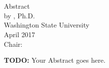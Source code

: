 \label{chap:chapter-1}

\begin{center}
	\begin{singlespace}
		\label{ssec:abstract}

		\MakeUppercase{\mytitleA}\\
    	\bigskip
    	\MakeUppercase{\mytitleB}\\
		\bigskip
		Abstract\\
		\bigskip \bigskip \bigskip
		by \myname, Ph.D.\\
		Washington State University\\
		April 2017\\
		\bigskip \bigskip \bigskip
		Chair: \mychair	
	\end{singlespace}
\end{center}
  

\textbf{TODO:}  Your Abstract goes here.


\newpage